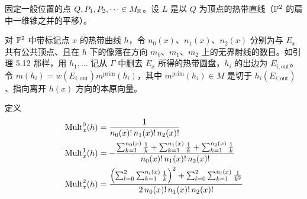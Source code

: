 \begin{definition}
固定一般位置的点 $Q,P_1,P_2,\cdots\in M_{\mathbb{R}}$。设 $L$ 是以 $Q$ 为顶点的热带直线（$\mathbb{P}^2$ 的扇中一维锥之并的平移）。

对 $\mathbb{P}^2$ 中带标记点 $x$ 的热带曲线 $h$，令 $n_0(x)$、$n_1(x)$、$n_2(x)$ 分别为与 $E_x$ 共有公共顶点、且在 $h$ 下的像落在方向 $m_0$、$m_1$、$m_2$ 上的无界射线的数目。如引理 5.12 那样，用 $h_1,\ldots$ 记从 $\Gamma$ 中删去 $E_x$ 所得的热带圆盘，$h_i$ 的出边为 $E_{i,\mathrm{out}}$。令 $m(h_i)=w(E_{i,\mathrm{out}})m^{\mathrm{prim}}(h_i)$，其中 $m^{\mathrm{prim}}(h_i)\in M$ 是切于 $h_i(E_{i,\mathrm{out}})$、指向离开 $h(x)$ 方向的本原向量。

定义
\begin{align*}
  \operatorname{Mult}^0_x(h)&=\frac{1}{n_0(x)!\,n_1(x)!\,n_2(x)!}\\
  \operatorname{Mult}^1_x(h)&=
  -\frac{\sum_{k=1}^{n_0(x)}\frac{1}{k}+\sum_{k=1}^{n_1(x)}\frac{1}{k}+\sum_{k=1}^{n_2(x)}\frac{1}{k}}
  {n_0(x)!\,n_1(x)!\,n_2(x)!}\\
  \operatorname{Mult}^2_x(h)&=
  \frac{\Bigl(\sum_{l=0}^{2}\sum_{k=1}^{n_l(x)}\frac{1}{k}\Bigr)^{2}
  +\sum_{l=0}^{2}\sum_{k=1}^{n_l(x)}\frac{1}{k^{2}}}
  {2\,n_0(x)!\,n_1(x)!\,n_2(x)!}
\end{align*}



\end{definition}
